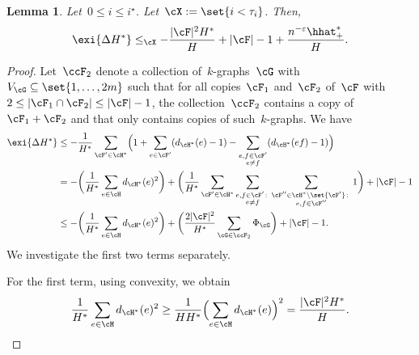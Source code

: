 \documentclass[11pt]{amsart}
\newcommand{\eps}{\varepsilon}
\DeclarePairedDelimiter{\paren}{\lparen}{\rparen}
\DeclarePairedDelimiter{\abs}{\lvert}{\rvert}
\newcommand{\Xleq}{\leq_{\cX}}
\newtheorem{lemma}[algocf]{Lemma}
\theoremstyle{definition}
\numberwithin{equation}{section}
\begin{document}
	
	\begin{lemma}\label{lemma: sparse copy trend}
		Let~$0\leq i\leq i^\star$.
		Let~$\cX:=\set{ i<\tau_i }$.
		Then,
		\begin{equation*}
			\exi{\Delta H^*}\Xleq -\frac{\abs{\cF}^2 H^*}{H}+\abs{\cF}-1+\frac{n^{-\eps}\hhat^*_+}{H}.
		\end{equation*}
	\end{lemma}
	
	\begin{proof}
		Let~$\ccF_2$ denote a collection of~$k$-graphs~$\cG$ with~$V_\cG\subseteq\set{1,\ldots,2m}$ such that for all copies~$\cF_1$ and~$\cF_2$ of~$\cF$ with~$2\leq \abs{\cF_1\cap\cF_2}\leq \abs{\cF}-1$, the collection~$\ccF_2$ contains a copy of~$\cF_1+\cF_2$ and that only contains copies of such~$k$-graphs.
		We have
		\begin{equation}\label{equation: expected one step}
			\begin{aligned}
				\exi{\Delta H^*}
				&\leq -\frac{1}{H^*}\sum_{\cF'\in\cH^*}\paren[\Big]{1+\sum_{e\in\cF'}(d_{\cH^*}(e)-1)-\sum_{\substack{e,f\in\cF'\\ e\neq f}}(d_{\cH^*}(ef)-1)}\\
				&=-\paren[\bigg]{\frac{1}{H^*}\sum_{e\in\cH} d_{\cH^*}(e)^2}+\paren[\bigg]{\frac{1}{H^*}\sum_{\cF'\in\cH^*}\sum_{\substack{ e,f\in\cF' \colon\\ e\neq f }}\sum_{\substack{ \cF''\in\cH^*\setminus\set{\cF'}\colon\\ e,f\in\cF'' }}1 }+\abs{\cF}-1\\
				&\leq -\paren[\bigg]{\frac{1}{H^*}\sum_{e\in\cH} d_{\cH^*}(e)^2}+\paren[\bigg]{\frac{2\abs{\cF}^2}{H^*}\sum_{\cG\in\ccF_2 } \Phi_{\cG} }+\abs{\cF}-1.
			\end{aligned}
		\end{equation}
		We investigate the first two terms separately.
		
		For the first term, using convexity, we obtain
		\begin{equation}\label{equation: expected one step first}
			\frac{1}{H^*}\sum_{e\in\cH} d_{\cH^*}(e)^2
			\geq \frac{1}{HH^*}\paren[\Big]{\sum_{e\in\cH} d_{\cH^*}(e)}^2
			= \frac{\abs{\cF}^2 H^*}{H}.
		\end{equation}
		

\end{proof}
\end{document}
